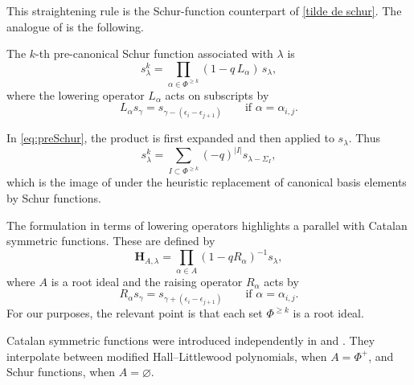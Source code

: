This straightening rule is the Schur-function counterpart of \eqref{tilde de schur}. The analogue of  is the following.

\begin{definition}\rm
The $k$-th pre-canonical Schur function associated with $\lambda$ is
\begin{equation}\label{eq:preSchur}
  s_{\lambda}^{k}
  =  \prod_{\alpha \in \Phi^{\ge k}} (1 - q\,L_{\alpha})\, s_{\lambda},
\end{equation}
where the lowering operator $L_\alpha$ acts on subscripts by
\[
    L_{\alpha}s_{\gamma}=s_{\gamma-(\epsilon_i-\epsilon_{j+1})}
    \qquad \mbox{if } \alpha=\alpha_{i,j}.
\]
\end{definition}

In \eqref{eq:preSchur}, the product is first expanded and then applied to $s_\lambda$. Thus
\begin{equation}\label{eq:preSchurA}
  s_{\lambda}^{k}
  = \sum_{I\subset \Phi^{\geq k}} (-q)^{|I|} s_{\lambda-\Sigma_I},  
\end{equation}
which is the image of  under the heuristic replacement of canonical basis elements by Schur functions.

The formulation in terms of lowering operators highlights a parallel with Catalan symmetric functions. These are defined by
\begin{equation}
\mathbf{H}_{A,\lambda}
  = \prod_{\alpha\in A} (1 - q R_{\alpha})^{-1} s_{\lambda},
\end{equation}
where $A$ is a root ideal and the raising operator $R_\alpha$ acts by
\[
    R_{\alpha}s_\gamma=s_{\gamma+(\epsilon_i-\epsilon_{j+1})}
    \qquad \mbox{if } \alpha=\alpha_{i,j}.
\]
For our purposes, the relevant point is that each set $\Phi^{\geq k}$ is a root ideal.

Catalan symmetric functions were introduced independently in \cite{chen2010skew} and \cite{panyushev2010generalised}. They interpolate between modified Hall--Littlewood polynomials, when $A=\Phi^+$, and Schur functions, when $A=\varnothing$.

